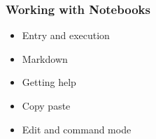 \begin{frame}
    \frametitle{Working with Notebooks}

    \begin{itemize}
        \item Entry and execution
    \vspace{1em}
        \item Markdown
    \vspace{1em}
        \item Getting help
    \vspace{1em}
        \item Copy paste
    \vspace{1em}
        \item Edit and command mode
    \end{itemize}

\end{frame}








